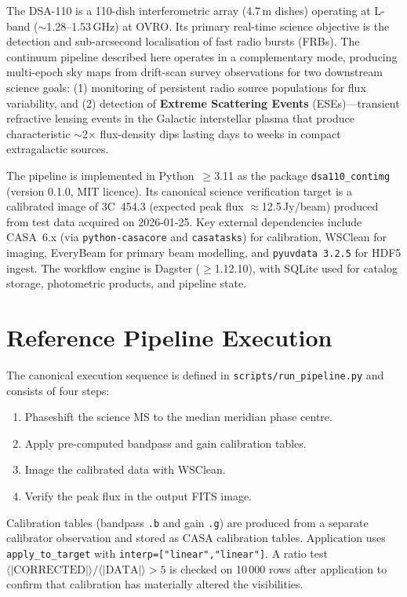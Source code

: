 \documentclass[12pt,a4paper]{article}
\newcommand{\code}[1]{\colorbox{codegray}{\texttt{\small #1}}}
\begin{document}
The DSA-110 is a 110-dish interferometric array (4.7\,m dishes) operating at
L-band ($\sim$1.28--1.53\,GHz) at OVRO.  Its primary real-time science
objective is the detection and sub-arcsecond localisation of fast radio
bursts (FRBs).  The continuum pipeline described here operates in a
complementary mode, producing multi-epoch sky maps from drift-scan survey
observations for two downstream science goals:
(1) monitoring of persistent radio source populations for flux variability, and
(2) detection of \textbf{Extreme Scattering Events} (ESEs)---transient
refractive lensing events in the Galactic interstellar plasma that produce
characteristic $\sim$2$\times$ flux-density dips lasting days to weeks in
compact extragalactic sources.

The pipeline is implemented in Python~$\geq$3.11 as the package
\texttt{dsa110\_contimg} (version 0.1.0, MIT licence).  Its canonical science
verification target is a calibrated image of 3C~454.3 (expected peak flux
$\approx$12.5\,Jy/beam) produced from test data acquired on 2026-01-25.
Key external dependencies include CASA~6.x (via \texttt{python-casacore}
and \texttt{casatasks}) for calibration, WSClean for imaging, EveryBeam for
primary beam modelling, and \texttt{pyuvdata~3.2.5} for HDF5 ingest.  The
workflow engine is Dagster ($\geq$1.12.10), with SQLite used for catalog
storage, photometric products, and pipeline state.

\section{Reference Pipeline Execution}

The canonical execution sequence is defined in
\texttt{scripts/run\_pipeline.py} and consists of four steps:
\begin{enumerate}[leftmargin=2em]
  \item Phaseshift the science MS to the median meridian phase centre.
  \item Apply pre-computed bandpass and gain calibration tables.
  \item Image the calibrated data with WSClean.
  \item Verify the peak flux in the output FITS image.
\end{enumerate}

Calibration tables (bandpass \texttt{.b} and gain \texttt{.g}) are produced
from a separate calibrator observation and stored as CASA calibration tables.
Application uses \code{apply\_to\_target} with
\code{interp=["linear","linear"]}.  A ratio test
$\langle|\text{CORRECTED}|\rangle / \langle|\text{DATA}|\rangle > 5$
is checked on 10\,000 rows after application to confirm that calibration has
materially altered the visibilities.
\end{document}
